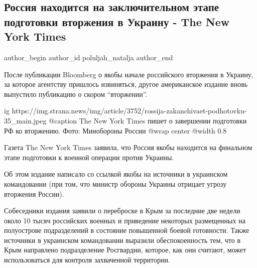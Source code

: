  
 
 
 
 
 
\subsection{Россия находится на заключительном этапе подготовки вторжения в Украину - The New York Times}
\label{sec:05_02_2022.stz.news.ua.strana.1.vtorzhenie_nyt}
 
\ifcmt
 author_begin
   author_id poluljah_natalja
 author_end
\fi

После публикации Bloomberg о якобы начале российского вторжения в Украину, за
которое агентству пришлось извиняться, другое американское издание вновь
выпустило публикацию о скором \enquote{вторжении}.

\ifcmt
  ig https://img.strana.news/img/article/3752/rossija-zakanchivaet-podhotovku-35_main.jpeg
  @caption The New York Times пишет о завершении подготовки РФ ко вторжению. Фото: Минобороны России
  @wrap center
  @width 0.8
\fi

Газета The New York Times заявила, что Россия якобы находится на финальном
этапе подготовки к военной операции против Украины.

Об этом издание написало со ссылкой якобы на источники в украинском
командовании (при том, что министр обороны Украины отрицает угрозу вторжения
России).

Собеседники издания заявили о переброске в Крым за последние две недели около
10 тысяч российских военных и приведение некоторых размещенных на полуострове
подразделений в состояние повышенной боевой готовности. Также источники в
украинском командовании выразили обеспокоенность тем, что в Крым направлено
подразделение Росгвардии, которое, как они считают, может использоваться для
контроля захваченной территории.

